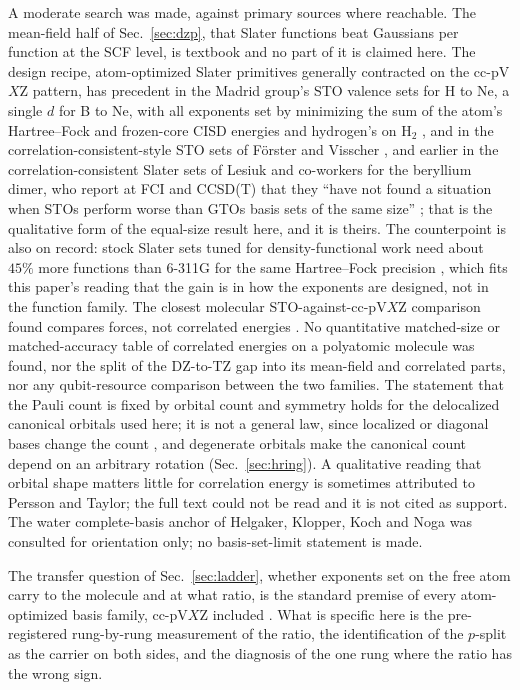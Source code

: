 \documentclass[aps,pra,twocolumn,superscriptaddress,longbibliography]{revtex4-2}
\begin{document}
A moderate search was made, against primary sources where reachable.
The mean-field half of Sec.~\ref{sec:dzp}, that Slater functions beat
Gaussians per function at the SCF level, is textbook and no part of it
is claimed here.  The design recipe, atom-optimized Slater primitives
generally contracted on the cc-pV$X$Z pattern, has precedent in the
Madrid group's STO valence sets for H to Ne, a single $d$ for B to Ne,
with all exponents set by minimizing the sum of the atom's
Hartree--Fock and frozen-core CISD energies and hydrogen's on H$_2$
\cite{ema2003}, and in the correlation-consistent-style STO
sets of F\"orster and Visscher \cite{forster2021}, and earlier in the
correlation-consistent Slater sets of Lesiuk and co-workers for the
beryllium dimer, who report at FCI and CCSD(T) that they ``have not
found a situation when STOs perform worse than GTOs basis sets of the
same size'' \cite{lesiuk2015}; that is the qualitative form of the
equal-size result here, and it is theirs.  The counterpoint is also on
record: stock Slater sets tuned for density-functional work need about
$45\%$ more functions than 6-311G for the same Hartree--Fock precision
\cite{nemec2010}, which fits this paper's reading that the gain is in
how the exponents are designed, not in the function family.  The closest
molecular STO-against-cc-pV$X$Z comparison found compares forces, not
correlated energies \cite{rico2004}.  No quantitative matched-size or
matched-accuracy table of correlated energies on a polyatomic molecule
was found, nor the split of the DZ-to-TZ gap into its mean-field and
correlated parts, nor any qubit-resource comparison between the two
families.  The statement that the Pauli count is fixed by orbital count
and symmetry holds for the delocalized canonical orbitals used here; it
is not a general law, since localized or diagonal bases change the count
\cite{koridon2021}, and degenerate orbitals make the canonical count depend
on an arbitrary rotation (Sec.~\ref{sec:hring}).  A qualitative
reading that orbital shape matters little for correlation energy is
sometimes attributed to Persson and Taylor; the full text could not be
read and it is not cited as support.  The water complete-basis anchor of
Helgaker, Klopper, Koch and Noga \cite{helgaker1997} was consulted for
orientation only; no basis-set-limit statement is made.

The transfer question of Sec.~\ref{sec:ladder}, whether exponents set on
the free atom carry to the molecule and at what ratio, is the standard
premise of every atom-optimized basis family, cc-pV$X$Z included
\cite{dunning1989}.  What is specific here is the pre-registered
rung-by-rung measurement of the ratio, the identification of the
$p$-split as the carrier on both sides, and the diagnosis of the one
rung where the ratio has the wrong sign.
\end{document}
